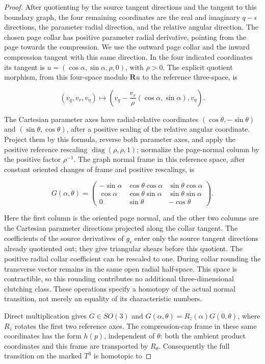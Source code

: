 \begin{proof}
After quotienting by the source tangent directions and the tangent
to this boundary graph, the four remaining coordinates are the
real and imaginary \(q-\epsilon\) directions, the parameter radial
direction, and the relative angular direction.  The chosen page
collar has positive parameter radial derivative, pointing from the
page towards the compression.  We use the outward page collar and
the inward compression tangent with this same direction.  In the
four indicated coordinates its tangent is
\(u=(\cos\alpha,\sin\alpha,\rho,0)\), with \(\rho>0\).
The explicit quotient morphism, from this four-space modulo
\(\mathbf Ru\) to the reference three-space, is

\[
 (v_q,v_r,v_\eta)\longmapsto
 \left(v_q-\frac{v_r}{\rho}(\cos\alpha,\sin\alpha),v_\eta\right).
\]

The Cartesian parameter axes have radial-relative coordinates
\((\cos\theta,-\sin\theta)\) and
\((\sin\theta,\cos\theta)\), after a positive scaling of the
relative angular coordinate.  Project them by this formula,
reverse both parameter axes, and apply the positive reference
rescaling \(\operatorname{diag}(\rho,\rho,1)\); normalize the
page-normal column by the positive factor \(\rho^{-1}\).
The graph normal frame in
this reference space, after constant oriented changes of frame and
positive rescalings, is

\[
 G(\alpha,\theta)=
 \begin{pmatrix}
 -\sin\alpha&\cos\theta\cos\alpha&\sin\theta\cos\alpha\\
 \cos\alpha&\cos\theta\sin\alpha&\sin\theta\sin\alpha\\
 0&\sin\theta&-\cos\theta
 \end{pmatrix}.
\]

Here the first column is the oriented page normal, and the other
two columns are the Cartesian parameter directions projected along
the collar tangent.  The coefficients of the source derivatives
of \(g_\epsilon\) enter only the source tangent directions already
quotiented out; they give triangular shears before this quotient.
The positive radial collar coefficient can be rescaled to one.
During collar rounding the transverse vector remains in the same
open radial half-space.  This space is contractible, so this
rounding contributes no additional three-dimensional clutching
class.  These operations specify a homotopy of the actual normal
transition, not merely an equality of its characteristic numbers.

Direct multiplication gives \(G\in SO(3)\) and
\(G(\alpha,\theta)=R_z(\alpha)G(0,\theta)\), where \(R_z\)
rotates the first two reference axes.  The compression-cap frame
in these same coordinates has the form \(h(p)\), independent of
\(\theta\): both the ambient product coordinates and this frame
are transported by \(R_\theta\).  Consequently the full transition
on the marked \(T^3\) is homotopic to


\end{proof}

